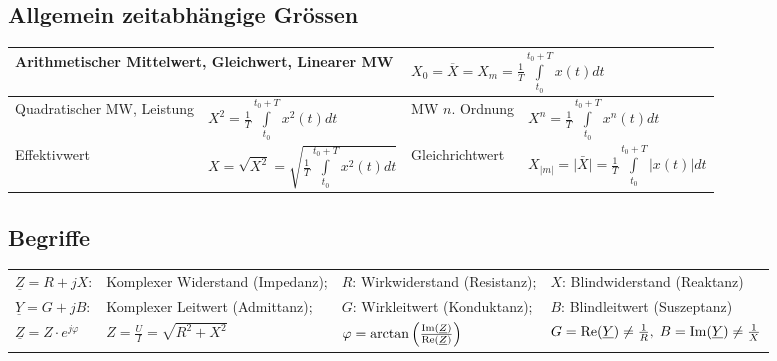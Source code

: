 	\subsection{Allgemein zeitabhängige Grössen}
	\begin{tabular}{|ll|ll|}
    \hline
	\multicolumn{2}{|l}{Arithmetischer Mittelwert, Gleichwert, Linearer MW} 
	    	& \multicolumn{2}{l|}{$X_0 = \overline{X} = X_m = \frac {1} {T} \int\limits_{t_0}^{t_0+T}
	    	x(t)dt$} \\
	\hline
	Quadratischer MW, Leistung 
		& $X^2 = \frac {1} {T} \int\limits_{t_0}^{t_0+T} x^2(t)dt$ 
		& MW $n$. Ordnung
		& $X^n = \frac {1} {T} \int\limits_{t_0}^{t_0+T} x^n(t)dt$ \\
	\hline
	Effektivwert 
		& $X = \sqrt{X^2} = \sqrt{\frac{1}{T} \int\limits ^{t_0+T}_{t_0}{x^2(t)dt}}$
		& Gleichrichtwert 
		& $X_{|m|} = \bar{|X|} = \frac{1}{T} \int\limits_{t_0}^{t_0+T}{|x(t)| dt}$ \\
	\hline
   	\end{tabular}

	\subsection{Begriffe}
		\begin{tabular}{llll}
		$\underline{Z} = R +j X$: 
			& Komplexer Widerstand (Impedanz); 
			& $R$: Wirkwiderstand (Resistanz); 
			& $X$: Blindwiderstand (Reaktanz)\\
		$\underline{Y} = G + j B$: 
			& Komplexer Leitwert (Admittanz); 
			& $G$: Wirkleitwert (Konduktanz); 
			& $B$: Blindleitwert (Suszeptanz)\\
		$\underline{Z}=Z\cdot e^{j\varphi}$ & $Z=\frac{U}{I}=\sqrt{R^2+X^2}$ &
		$\varphi =
		\arctan\left(\frac{\operatorname{Im}(\underline{Z})}{\operatorname{Re}(\underline{Z})}\right)$&
		$G=\operatorname{Re}(\underline{Y})\neq\frac{1}{R}, \;
		B=\operatorname{Im}(\underline{Y})\neq\frac{1}{X}$
      	\end{tabular}
	
